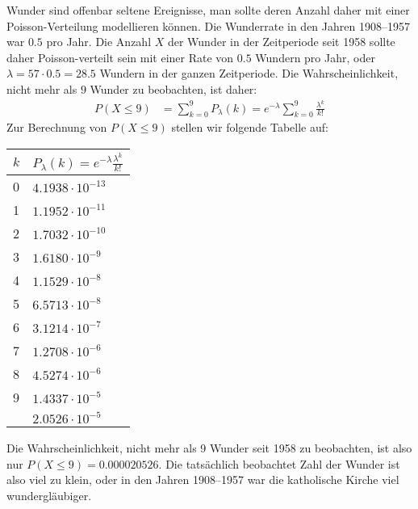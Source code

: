 \begin{loesung}
Wunder sind offenbar seltene Ereignisse, man sollte deren Anzahl daher
mit einer Poisson-Verteilung modellieren können. Die Wunderrate in den
Jahren 1908--1957 war $0.5$ pro Jahr.
Die Anzahl $X$ der Wunder in der Zeitperiode
seit 1958 sollte daher Poisson-verteilt sein mit einer Rate von $0.5$ 
Wundern pro Jahr, oder $\lambda=57\cdot0.5 =28.5$ Wundern in der
ganzen Zeitperiode.
Die Wahrscheinlichkeit, nicht mehr als $9$ Wunder zu beobachten,
ist daher:
\begin{align*}
P(X\le 9)
&=
\sum_{k=0}^9 P_\lambda(k)=e^{-\lambda}\sum_{k=0}^9 \frac{\lambda^k}{k!}
\end{align*}
Zur Berechnung von $P(X\le 9)$ stellen wir folgende Tabelle auf:
\begin{center}
\begin{tabular}{|l|l|}
\hline
$k$&$P_\lambda(k)=e^{-\lambda}\frac{\lambda^k}{k!}$\\
\hline
  0&$4.1938\cdot 10^{-13}$\\
  1&$1.1952\cdot 10^{-11}$\\
  2&$1.7032\cdot 10^{-10}$\\
  3&$1.6180\cdot 10^{-9}$\\
  4&$1.1529\cdot 10^{-8}$\\
  5&$6.5713\cdot 10^{-8}$\\
  6&$3.1214\cdot 10^{-7}$\\
  7&$1.2708\cdot 10^{-6}$\\
  8&$4.5274\cdot 10^{-6}$\\
  9&$1.4337\cdot 10^{-5}$\\
\hline
   &$2.0526\cdot 10^{-5}$\\
\hline
\end{tabular}
\end{center}
Die Wahrscheinlichkeit, nicht mehr als 9 Wunder seit 1958 zu beobachten,
ist also nur $P(X\le 9)=0.000020526$.
Die tatsächlich beobachtet Zahl der Wunder ist also viel zu klein,
oder in den Jahren 1908--1957 war die katholische Kirche viel wundergläubiger.
\end{loesung}

